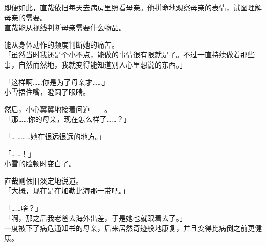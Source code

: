 即便如此，直哉依旧每天去病房里照看母亲。他拼命地观察母亲的表情，试图理解母亲的需要。\\

直哉能从视线判断母亲需要什么物品。

能从身体动作的频度判断她的痛苦。\\

「虽然当时我还是个小不点，能做的事情很有限就是了。不过一直持续做着那些事，自然而然地，我就变得能知道别人心里想说的东西。」

「这样啊……你是为了母亲才……」\\

小雪捂住嘴，瞪圆了眼睛。

然后，小心翼翼地接着问道——。\\

「那……你的母亲，现在怎么样了……？」

「…………她在很远很远的地方。」

「……！」\\

小雪的脸顿时变白了。

直哉则依旧淡定地说道。\\

「大概，现在是在加勒比海那一带吧。」

「……啥？」\\

「啊，那之后我老爸去海外出差，于是她也就跟着去了。」\\

一度被下了病危通知书的母亲，后来居然奇迹般地康复，并且变得比病倒之前更健康。

